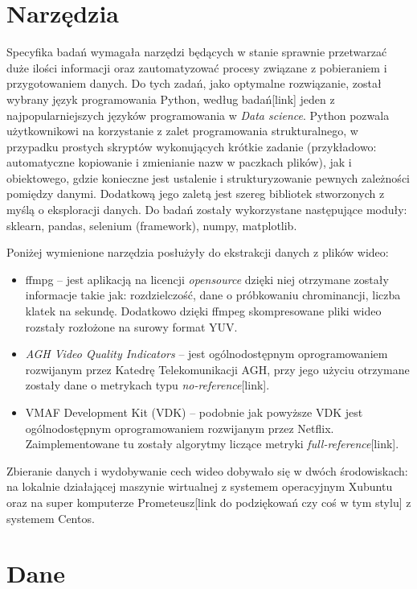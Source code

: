 \section{Narzędzia}
Specyfika badań wymagała narzędzi będących w stanie sprawnie przetwarzać duże ilości informacji oraz zautomatyzować procesy związane z pobieraniem i przygotowaniem danych. Do tych zadań, jako optymalne rozwiązanie, został wybrany język programowania Python, według badań[link] jeden z najpopularniejszych języków programowania w {\em Data science}. Python pozwala użytkownikowi na korzystanie z zalet programowania strukturalnego, w przypadku prostych skryptów wykonujących krótkie zadanie (przykładowo: automatyczne kopiowanie i zmienianie nazw w paczkach plików), jak i obiektowego, gdzie konieczne jest ustalenie i strukturyzowanie pewnych zależności pomiędzy danymi. Dodatkową jego zaletą jest szereg bibliotek stworzonych z myślą o eksploracji danych. Do badań zostały wykorzystane następujące moduły: sklearn, pandas, selenium (framework), numpy, matplotlib.\par\par
Poniżej wymienione narzędzia posłużyły do ekstrakcji danych z plików wideo:
\begin{itemize}[label=$\bullet$]
\item ffmpg -- jest aplikacją na licencji {\em opensource} dzięki niej otrzymane zostały informacje takie jak: rozdzielczość, dane o próbkowaniu chrominancji, liczba klatek na sekundę. Dodatkowo dzięki ffmpeg skompresowane pliki wideo rozstały rozłożone na surowy format YUV.
\item {\em AGH Video Quality Indicators} -- jest ogólnodostępnym oprogramowaniem rozwijanym przez Katedrę Telekomunikacji AGH, przy jego użyciu otrzymane zostały dane o metrykach typu {\em no-reference}[link].
\item VMAF Development Kit (VDK) -- podobnie jak powyższe VDK jest ogólnodostępnym oprogramowaniem rozwijanym przez Netflix. Zaimplementowane tu zostały algorytmy liczące metryki {\em full-reference}[link].
\end{itemize}
Zbieranie danych i wydobywanie cech wideo dobywało się w dwóch środowiskach: na lokalnie działającej maszynie wirtualnej z systemem operacyjnym Xubuntu oraz na super komputerze Prometeusz[link do podziękowań czy coś w tym stylu] z systemem Centos. 

\label{cha:drugiDokument}



\section{Dane}
\label{cha:drugiDokument}

